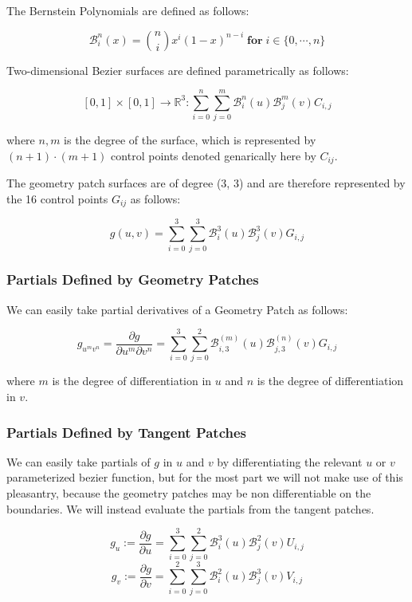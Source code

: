 \documentclass[12pt, letterpaper]{article}
\begin{document}
		The Bernstein Polynomials are defined as follows:
		
		$$\mathcal{B}_{i}^{n}(x) = \binom{n}{i}x^{i}(1-x)^{n-i} \; \textbf{for} \; i \in \{0, \cdots, n\}  $$
		
		Two-dimensional Bezier surfaces are defined parametrically as follows: 
		
		$$[0, 1] \times [0, 1] \rightarrow \mathbb{R}^{3} : \sum_{i=0}^{n}{\sum_{j=0}^{m}{\mathcal{B}_{i}^{n}(u) \mathcal{B}_{j}^{m}(v) C_{i, j}}}$$
		
		where $n, m$ is the degree of the surface, which is represented by $(n + 1) \cdot (m + 1)$ control points denoted genarically here by $C_{ij}$.
		
		The geometry patch surfaces are of degree (3, 3) and are therefore represented by the 16 control points $G_{ij}$ as follows:
		
		$$g(u, v) = \sum_{i=0}^{3}{\sum_{j=0}^{3}{\mathcal{B}_{i}^{3}(u) \mathcal{B}_{j}^{3}(v) G_{i, j}}}$$
		
		\subsubsection{Partials Defined by Geometry Patches}

		We can easily take partial derivatives of a Geometry Patch as follows:

		$$g_{u^{m}v^{n}} = \frac{\partial g}{\partial u^{m} \partial v^{n}} = \sum_{i=0}^{3}{\sum_{j=0}^{2}{\mathcal{B}_{i, 3}^{(m)}(u) \mathcal{B}_{j, 3}^{(n)}(v) G_{i, j}}}$$

		where $m$ is the degree of differentiation in $u$ and $n$ is the degree of differentiation in $v$.

		\subsubsection{Partials Defined by Tangent Patches}
		
		We can easily take partials of $g$ in $u$ and $v$ by differentiating the relevant $u$ or $v$ parameterized bezier function,
		but for the most part we will not make use of this pleasantry, because the geometry patches may be non differentiable on the boundaries.
		We will instead evaluate the partials from the tangent patches.
		
		$$g_{u} := \frac{\partial g}{\partial u} = \sum_{i=0}^{3}{\sum_{j=0}^{2}{\mathcal{B}_{i}^{3}(u) \mathcal{B}_{j}^{2}(v) U_{i, j}}}$$
		$$g_{v} := \frac{\partial g}{\partial v} = \sum_{i=0}^{2}{\sum_{j=0}^{3}{\mathcal{B}_{i}^{2}(u) \mathcal{B}_{j}^{3}(v) V_{i, j}}}$$
\end{document}
